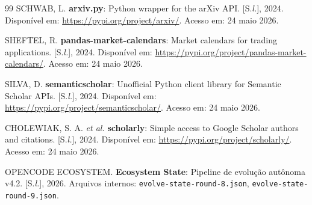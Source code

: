 \documentclass[12pt,a4paper]{article}
\begin{document}
\begin{thebibliography}{99}
SCHWAB, L. \textbf{arxiv.py}: Python wrapper for the arXiv API. [S.\textit{l.}], 2024.
Disponível em: \url{https://pypi.org/project/arxiv/}. Acesso em: 24 maio 2026.

SHEFTEL, R. \textbf{pandas-market-calendars}: Market calendars for trading applications.
[S.\textit{l.}], 2024. Disponível em: \url{https://pypi.org/project/pandas-market-calendars/}.
Acesso em: 24 maio 2026.

SILVA, D. \textbf{semanticscholar}: Unofficial Python client library for Semantic Scholar APIs.
[S.\textit{l.}], 2024. Disponível em: \url{https://pypi.org/project/semanticscholar/}.
Acesso em: 24 maio 2026.

CHOLEWIAK, S. A. \textit{et al.} \textbf{scholarly}: Simple access to Google Scholar authors
and citations. [S.\textit{l.}], 2024. Disponível em: \url{https://pypi.org/project/scholarly/}.
Acesso em: 24 maio 2026.

OPENCODE ECOSYSTEM. \textbf{Ecosystem State}: Pipeline de evolução autônoma v4.2. [S.\textit{l.}], 2026.
Arquivos internos: \texttt{evolve-state-round-8.json}, \texttt{evolve-state-round-9.json}.

\end{thebibliography}
\end{document}
